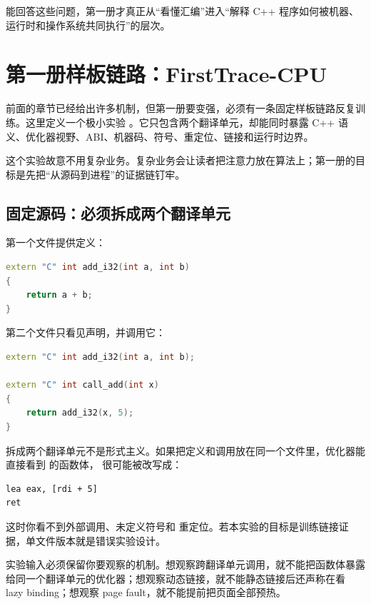 能回答这些问题，第一册才真正从“看懂汇编”进入“解释 C++ 程序如何被机器、运行时和操作系统共同执行”的层次。

\section{第一册样板链路：FirstTrace-CPU}

前面的章节已经给出许多机制，但第一册要变强，必须有一条固定样板链路反复训练。这里定义一个极小实验 。它只包含两个翻译单元，却能同时暴露 C++ 语义、优化器视野、ABI、机器码、符号、重定位、链接和运行时边界。

这个实验故意不用复杂业务。复杂业务会让读者把注意力放在算法上；第一册的目标是先把“从源码到进程”的证据链钉牢。

\subsection{固定源码：必须拆成两个翻译单元}

第一个文件提供定义：

\begin{lstlisting}[language=C++,caption={add\_i32\_def.cpp}]
extern "C" int add_i32(int a, int b)
{
    return a + b;
}
\end{lstlisting}

第二个文件只看见声明，并调用它：

\begin{lstlisting}[language=C++,caption={add\_i32\_caller.cpp}]
extern "C" int add_i32(int a, int b);

extern "C" int call_add(int x)
{
    return add_i32(x, 5);
}
\end{lstlisting}

拆成两个翻译单元不是形式主义。如果把定义和调用放在同一个文件里，优化器能直接看到  的函数体， 很可能被改写成：

\begin{lstlisting}
lea eax, [rdi + 5]
ret
\end{lstlisting}

这时你看不到外部调用、未定义符号和  重定位。若本实验的目标是训练链接证据，单文件版本就是错误实验设计。

\begin{keyidea}
实验输入必须保留你要观察的机制。想观察跨翻译单元调用，就不能把函数体暴露给同一个翻译单元的优化器；想观察动态链接，就不能静态链接后还声称在看 lazy binding；想观察 page fault，就不能提前把页面全部预热。
\end{keyidea}

